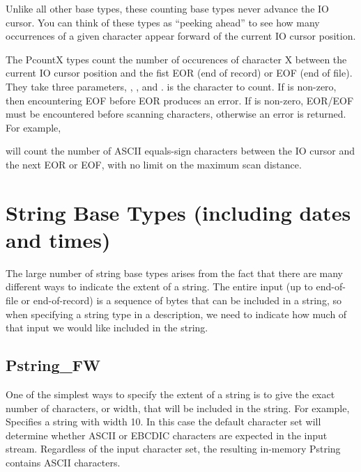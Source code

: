 \aedBegin{}
\aedEnd{}

Unlike all other base types, these counting base types
never advance the IO cursor.  You can think of these types as
``peeking ahead'' to see how many occurrences of a given character
appear forward of the current IO cursor position.

The PcountX types count the number of occurences of character X
between the current IO cursor position and the fist EOR (end of
record) or EOF (end of file).  They take three parameters, ,
, and .   is the character to count.  If
 is non-zero, then encountering EOF before EOR produces
an error.  If  is non-zero, EOR/EOF must be encountered
before scanning  characters, otherwise an error is returned.
For example,

%
\noindent
will count the number of ASCII equals-sign characters between
the IO cursor and the next EOR or EOF, with no limit on
the maximum scan distance.

\section{String Base Types (including dates and times)}

The large number of string base types arises from the fact that there
are many different ways to indicate the extent of a string.  The
entire input (up to end-of-file or end-of-record) is a sequence of
bytes that can be included in a string, so when specifying a string
type in a \padsl{} description, we need to indicate how much of that
input we would like included in the string.

\subsection{Pstring\_FW}

\aedBegin{}
\aedEnd{}

One of the simplest ways to specify the extent of a string is to give the
exact number of characters, or width, that will be included in the string.
For example,
%
\noindent
Specifies a string with width 10.  In this case the default character set
will determine whether ASCII or EBCDIC characters are expected in the
input stream.  Regardless of the input character set, the resulting in-memory 
Pstring contains ASCII characters. 

